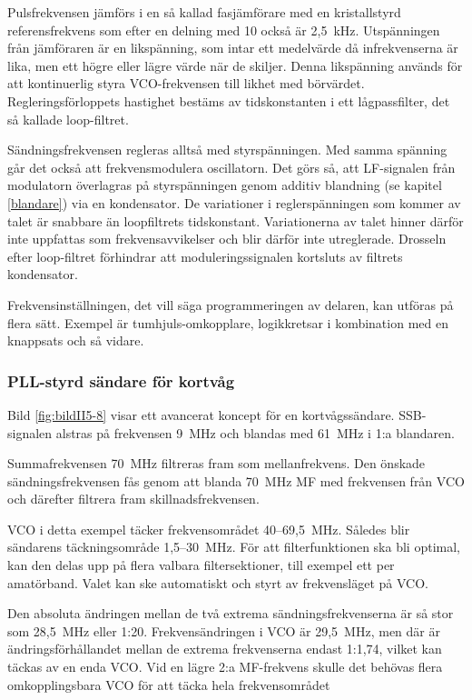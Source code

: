Pulsfrekvensen jämförs i en så kallad fasjämförare med en kristallstyrd
referensfrekvens som efter en delning med 10 också är 2,5~kHz.
Utspänningen från jämföraren är en likspänning, som intar ett
medelvärde då infrekvenserna är lika, men ett högre eller lägre värde
när de skiljer.
Denna likspänning används för att kontinuerlig styra VCO-frekvensen
till likhet med börvärdet.
Regleringsförloppets hastighet bestäms av tidskonstanten i ett
lågpassfilter, det så kallade loop-filtret.

Sändningsfrekvensen regleras alltså med styrspänningen.
Med samma spänning går det också att frekvensmodulera oscillatorn.
Det görs så, att LF-signalen från modulatorn överlagras på styrspänningen genom
additiv blandning (se kapitel \ref{blandare}) via en kondensator.
De variationer i reglerspänningen som kommer av talet är snabbare än
loopfiltrets tidskonstant.
Variationerna av talet hinner därför inte uppfattas som frekvensavvikelser och
blir därför inte utreglerade.
Drosseln efter loop-filtret förhindrar att moduleringssignalen
kortsluts av filtrets kondensator.

Frekvensinställningen, det vill säga programmeringen av delaren, kan utföras
på flera sätt. Exempel är tumhjuls-omkopplare,
logikkretsar i kombination med en knappsats och så vida\-re.

\subsubsection{PLL-styrd sändare för kortvåg}


Bild \ref{fig:bildII5-8} visar ett avancerat koncept för en kortvågssändare.
SSB-signalen alstras på frekvensen 9~MHz och blandas med 61~MHz i 1:a
blandaren.

Summafrekvensen 70~MHz filtreras fram som mellanfrekvens.
Den önskade sändningsfrekvensen fås genom att blanda 70~MHz MF med
frekvensen från VCO och därefter filtrera fram skillnadsfrekvensen.

VCO i detta exempel täcker frekvensområdet 40--69,5~MHz.
Således blir sändarens täckningsområde 1,5--30~MHz.
För att filterfunktionen ska bli optimal, kan den delas upp på flera
valbara filtersektioner, till exempel ett per amatörband.
Valet kan ske automatiskt och styrt av frekvensläget på VCO.

Den absoluta ändringen mellan de två extrema sändningsfrekvenserna är
så stor som 28,5~MHz eller 1:20.
Frekvensändringen i VCO är 29,5~MHz, men där är ändringsförhållandet
mellan de extrema frekvenserna endast 1:1,74, vilket kan täckas av en enda VCO.
Vid en lägre 2:a MF-frekvens skulle det behövas flera omkopplingsbara
VCO för att täcka hela frekvensområdet

